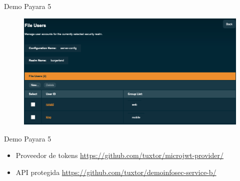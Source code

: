\documentclass[aspectratio=169]{beamer}
\begin{document}
\begin{frame}{Demo Payara 5}
    \begin{figure}
        \centering
        \includegraphics[width=0.9\linewidth]{Images/realms}
    \end{figure}
\end{frame}

\begin{frame}{Demo Payara 5}
    \begin{itemize}
        \item Proveedor de tokens \href{https://github.com/tuxtor/microjwt-provider/}{https://github.com/tuxtor/microjwt-provider/}
        \item API protegida \href{https://github.com/tuxtor/demoinfosec-service-b/}{https://github.com/tuxtor/demoinfosec-service-b/}
    \end{itemize}
\end{frame}
\end{document}
